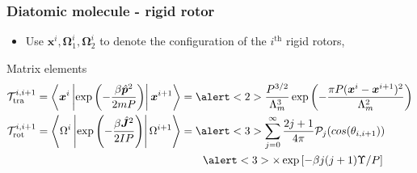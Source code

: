 \documentclass[xcolor=svgnames]{beamer}
\DeclareRobustCommand{\mc}[1]{\mathcal{#1}}
\DeclareRobustCommand{\mbf}[1]{{\boldsymbol {#1}}}
\begin{document}
        \begin{frame}
            \frametitle{Diatomic molecule - rigid rotor}
            \begin{itemize}
                \item Use $\mbf{x}^i, \mbf{\Omega}_1^i, \mbf{\Omega}_2^i$ to denote the configuration of the $i^\text{th}$ rigid rotors,
            \end{itemize}
            \begin{block}{Matrix elements}
                \begin{equation*}
                    \begin{aligned}
                        \mc{T}^{i,i+1}_{\text{tra}} = \left< \mbf{x}^i \left| \exp \left(-\displaystyle\frac{\beta \hat{\mbf{p}}^2}{2 m P} \right) \right| \mbf{x}^{i+1} \right> &= \alert<2>{\displaystyle\frac{P^{3/2}}{\Lambda_m^3} \exp \left(-\displaystyle\frac{\pi P (\mbf{x}^i - \mbf{x}^{i+1})^2}{\Lambda_m^2}\right)}\\
                        \mc{T}^{i,i+1}_{\text{rot}} = \left< \Omega^i \left| \exp \left(-\displaystyle\frac{\beta \hat{\mbf{J}}^2}{2IP} \right) \right| \Omega^{i+1} \right> &= \alert<3>{\displaystyle\sum_{j=0}^\infty \frac{2j+1}{4 \pi} \mc{P}_j (cos (\theta_{i,i+1}))}\\
                        &\qquad \alert<3>{\times \exp \left[-\beta j(j+1) \Upsilon/ P \right]}
                    \end{aligned}
                \end{equation*}
            \end{block}
        \end{frame}
\end{document}
